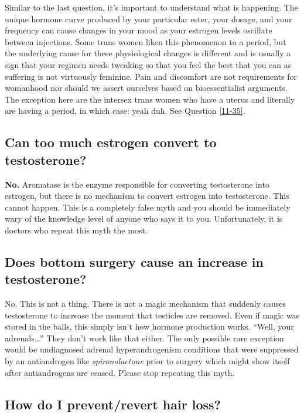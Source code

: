 \documentclass{article}
\begin{document}
Similar to the last question, it’s important to understand what is happening. The unique hormone curve produced by your particular ester, your dosage, and your frequency can cause changes in your mood as your estrogen levels oscillate between injections. Some trans women liken this phenomenon to a period, but the underlying cause for these physiological changes is different and is usually a sign that your regimen needs tweaking so that you feel the best that you can as suffering is not virtuously feminine. Pain and discomfort are not requirements for womanhood nor should we assert ourselves based on bioessentialist arguments. The exception here are the intersex trans women who have a uterus and literally are having a period, in which case: yeah duh. See Question \ref{11-35}.

\subsection{Can too much estrogen convert to testosterone?}

\textbf{No.} Aromatase is the enzyme responsible for converting testosterone into estrogen, but there is no mechanism to convert estrogen into testosterone. This cannot happen. This is a completely false myth and you should be immediately wary of the knowledge level of anyone who says it to you. Unfortunately, it is doctors who repeat this myth the most.

\subsection{Does bottom surgery cause an increase in testosterone?}

No. This is not a thing. There is not a magic mechanism that suddenly causes testosterone to increase the moment that testicles are removed. Even if magic was stored in the balls, this simply isn’t how hormone production works. “Well, your adrenals…” They don’t work like that either. The only possible rare exception would be undiagnosed adrenal hyperandrogenism conditions that were suppressed by an antiandrogen like \textit{spironolactone} prior to surgery which might show itself after antiandrogens are ceased. Please stop repeating this myth.

\subsection{How do I prevent/revert hair loss?}\label{11-14}
\end{document}
